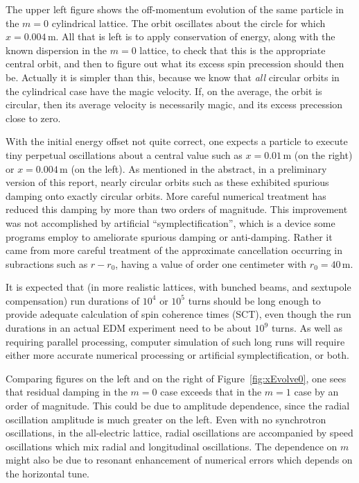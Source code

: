 \documentclass[]{article}
\begin{document}
The upper left figure shows the off-momentum evolution 
of the same particle in the $m=0$ cylindrical lattice.
The orbit oscillates about the circle for which $x=0.004\,$m.
All that is left is to apply conservation of energy, along with the
known dispersion in the $m=0$ lattice, to check that this is
the appropriate central orbit, and then to figure out what its
excess spin precession should then be. Actually it is simpler than this,
because we know that \emph{all}  circular orbits in the cylindrical 
case have the magic velocity. If, on the average, the orbit is 
circular, then its average velocity is necessarily magic, and its 
excess precession close to zero.
 
With the initial energy offset not quite correct, one expects 
a particle to execute tiny perpetual oscillations
about a central value such as $x=0.01\,$m (on the right)
or $x=0.004\,$m (on the left). As mentioned in the abstract, 
in a preliminary version of this report,
nearly circular orbits such as these exhibited spurious damping onto 
exactly circular orbits. More careful numerical treatment 
has reduced this damping by more than two orders of magnitude. This 
improvement was not accomplished by artificial ``symplectification'', 
which is a device some programs employ to ameliorate spurious damping
or anti-damping. Rather it came from more careful
treatment of the approximate cancellation occurring in subractions 
such as $r-r_0$, having a value of order one centimeter with $r_0=40\,$m.

It is expected that (in more realistic lattices, with bunched beams, 
and sextupole compensation) run durations of $10^4$ or $10^5$ turns 
should be long enough to provide adequate calculation of spin coherence 
times (SCT), even though the run durations in an actual EDM experiment 
need to be about $10^9$ turns. As well as requiring parallel processing,
computer simulation of such long runs will require either more accurate
numerical processing or artificial symplectification, or both.

Comparing figures on the left and on the right 
of Figure~\ref{fig:xEvolve0}, one sees that 
residual damping in the $m=0$ case exceeds that in the $m=1$ case
by an order of magnitude. This could be due to amplitude dependence,
since the radial oscillation amplitude is much greater on the left. Even
with no synchrotron oscillations, in the all-electric lattice, radial
oscillations are accompanied by speed oscillations which mix radial
and longitudinal oscillations. The dependence on $m$ might also
be due to resonant enhancement of numerical errors which depends on 
the horizontal tune.
\end{document}
